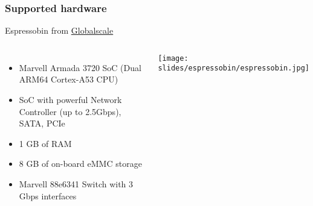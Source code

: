 \begin{frame}
\frametitle{Supported hardware}
  Espressobin from 
\href{https://espressobin.net/}{Globalscale}
  \begin{columns}
    \footnotesize
    \begin{itemize}
      \item Marvell Armada 3720 SoC (Dual ARM64 Cortex-A53 CPU)
      \item SoC with powerful Network Controller (up to 2.5Gbps), SATA, PCIe
      \item 1 GB of RAM
      \item 8 GB of on-board eMMC storage
      \item Marvell 88e6341 Switch with 3 Gbps interfaces
    \end{itemize}
    \begin{center}
      \texttt{[image: slides/espressobin/espressobin.jpg]}
    \end{center}
  \end{columns}
\end{frame}

